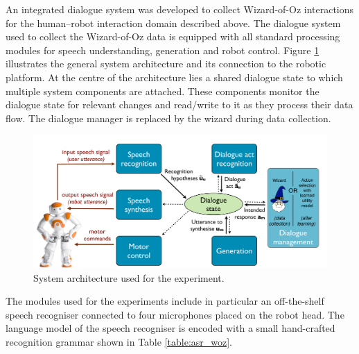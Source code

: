 An integrated dialogue system was developed to collect Wizard-of-Oz interactions for the human--robot interaction domain described above. The dialogue system used to collect the Wizard-of-Oz data is equipped with all standard processing modules for speech understanding, generation and robot control.  Figure \ref{fig:exp1_architecture} illustrates the general system architecture and its connection to the robotic platform. At the centre of the architecture lies a shared dialogue state to which multiple system components are attached. These components monitor the dialogue state for relevant changes and read/write to it as they process their data flow. The dialogue manager is replaced by the wizard during data collection. 

\begin{figure}[p]
\begin{center}
\includegraphics[scale=0.29]{imgs/exp1_architecture.pdf}
\end{center}
\caption{System architecture used for the experiment.}
\label{fig:exp1_architecture}
\end{figure}

The modules used for the experiments include in particular an off-the-shelf speech recogniser connected to four microphones placed on the robot head. The language model of the speech recogniser is encoded with a small hand-crafted recognition grammar shown in Table \ref{table:asr_woz}. 


\setlength{\grammarindent}{9em} 


